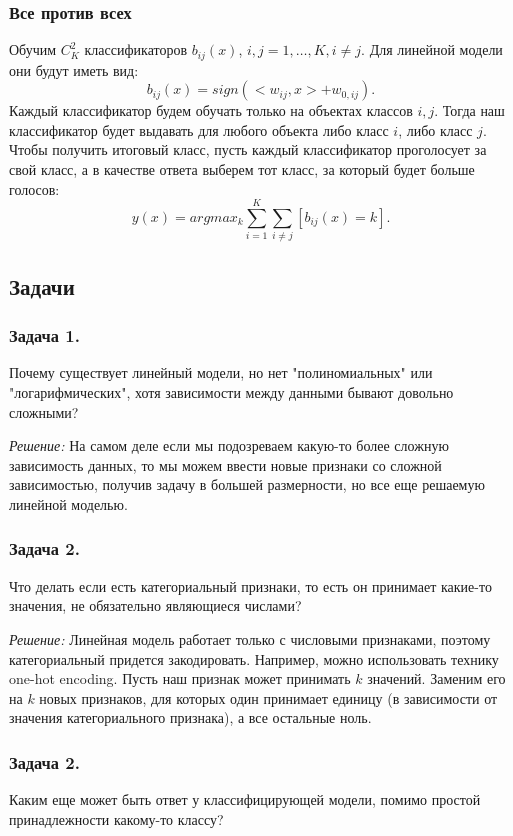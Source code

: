 \subsubsection*{Все против всех}
Обучим $C_K^2$ классификаторов $b_{ij}(x)$, $i, j = 1, \ldots, K, i \neq j$. Для линейной модели они будут иметь вид:
$$b_{ij}(x) = sign(<w_{ij}, x> + w_{0,ij}).$$ 
Каждый классификатор будем обучать только на объектах классов $i, j$. Тогда наш классификатор будет выдавать для любого объекта либо класс $i$, либо класс $j$. Чтобы получить итоговый класс, пусть каждый классификатор проголосует за свой класс, а в качестве ответа выберем тот класс, за который будет больше голосов:
$$y(x) = argmax_k\sum_{i=1}^{K}\sum_{i \neq j}[b_{ij}(x)=k].$$
\subsection{Задачи}
\subsubsection*{Задача 1.}
Почему существует линейный модели, но нет "полиномиальных" или "логарифмических", хотя зависимости между данными бывают довольно сложными?

\textit{Решение:} На самом деле если мы подозреваем какую-то более сложную зависимость данных, то мы можем ввести новые признаки со сложной зависимостью, получив задачу в большей размерности, но все еще решаемую линейной моделью.

\subsubsection*{Задача 2.}
Что делать если есть категориальный признаки, то есть он принимает какие-то значения, не обязательно являющиеся числами?

\textit{Решение:} Линейная модель работает только с числовыми признаками, поэтому категориальный придется закодировать. Например, можно использовать технику one-hot encoding. Пусть наш признак может принимать $k$ значений. Заменим его на $k$ новых признаков, для которых один принимает единицу (в зависимости от значения категориального признака), а все остальные ноль.

\subsubsection*{Задача 2.}
Каким еще может быть ответ у классифицирующей модели, помимо простой принадлежности какому-то классу?

